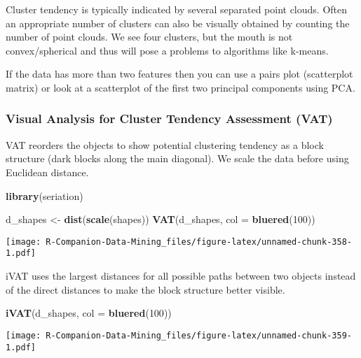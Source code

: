 \documentclass[
  notitlepage]{book}
\newenvironment{Shaded}{\begin{snugshade}}{\end{snugshade}}
\newcommand{\DataTypeTok}[1]{\textcolor[rgb]{0.13,0.29,0.53}{#1}}
\newcommand{\DecValTok}[1]{\textcolor[rgb]{0.00,0.00,0.81}{#1}}
\newcommand{\KeywordTok}[1]{\textcolor[rgb]{0.13,0.29,0.53}{\textbf{#1}}}
\newcommand{\NormalTok}[1]{#1}
\newcommand{\StringTok}[1]{\textcolor[rgb]{0.31,0.60,0.02}{#1}}
\begin{document}
Cluster tendency is typically indicated by several separated point
clouds. Often an appropriate number of clusters can also be visually
obtained by counting the number of point clouds. We see four clusters,
but the mouth is not convex/spherical and thus will pose a problems to
algorithms like k-means.

If the data has more than two features then you can use a pairs plot
(scatterplot matrix) or look at a scatterplot of the first two principal
components using PCA.

\hypertarget{visual-analysis-for-cluster-tendency-assessment-vat}{%
\subsubsection{Visual Analysis for Cluster Tendency Assessment (VAT)}\label{visual-analysis-for-cluster-tendency-assessment-vat}}

VAT reorders the objects to show potential clustering tendency as a
block structure (dark blocks along the main diagonal). We scale the data
before using Euclidean distance.

\begin{Shaded}
\begin{Highlighting}[]
\KeywordTok{library}\NormalTok{(seriation)}

\NormalTok{d\_shapes \textless{}{-}}\StringTok{ }\KeywordTok{dist}\NormalTok{(}\KeywordTok{scale}\NormalTok{(shapes))}
\KeywordTok{VAT}\NormalTok{(d\_shapes, }\DataTypeTok{col =} \KeywordTok{bluered}\NormalTok{(}\DecValTok{100}\NormalTok{))}
\end{Highlighting}
\end{Shaded}

\texttt{[image: R-Companion-Data-Mining\_files/figure-latex/unnamed-chunk-358-1.pdf]}

iVAT uses the largest distances for all possible paths between two
objects instead of the direct distances to make the block structure
better visible.

\begin{Shaded}
\begin{Highlighting}[]
\KeywordTok{iVAT}\NormalTok{(d\_shapes, }\DataTypeTok{col =} \KeywordTok{bluered}\NormalTok{(}\DecValTok{100}\NormalTok{))}
\end{Highlighting}
\end{Shaded}

\texttt{[image: R-Companion-Data-Mining\_files/figure-latex/unnamed-chunk-359-1.pdf]}
\end{document}
